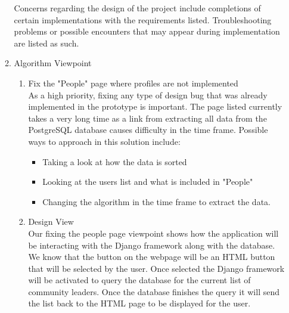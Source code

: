 \documentclass[draftclsnofoot,10pt,onecolumn]{IEEEtran} %
\begin{document}
\begin{enumerate}
\begin{enumerate}
		Concerns regarding the design of the project include completions of certain implementations with the requirements
		listed. Troubleshooting problems or possible encounters that may appear during implementation are listed as such.\\
		
		\item Algorithm Viewpoint \\
			\begin{enumerate}
				\item Fix the "People" page where profiles are not implemented \\
				As a high priority, fixing any type of design bug that was already implemented in the prototype is
				important. The page listed currently takes a very long time as a link from extracting all data from the
				PostgreSQL database causes difficulty in the time frame. Possible ways to approach in this solution
				include:
				\begin{itemize}
					\item Taking a look at how the data is sorted
					\item Looking at the users list and what is included in "People"
					\item Changing the algorithm in the time frame to extract the data.\\
				\end{itemize}
				
				\item Design View \\%
				Our fixing the people page viewpoint shows how the application will be interacting with the Django
				framework along with the database. We know that the button on the webpage will be an HTML button that
				will be selected by the user. Once selected the Django framework will be activated to query the database
				for the current list of community leaders. Once the database finishes the query it will send the list back to
				the HTML page to be displayed for the user.\\
				

\end{enumerate}
\end{enumerate}
\end{enumerate}
\end{document}
